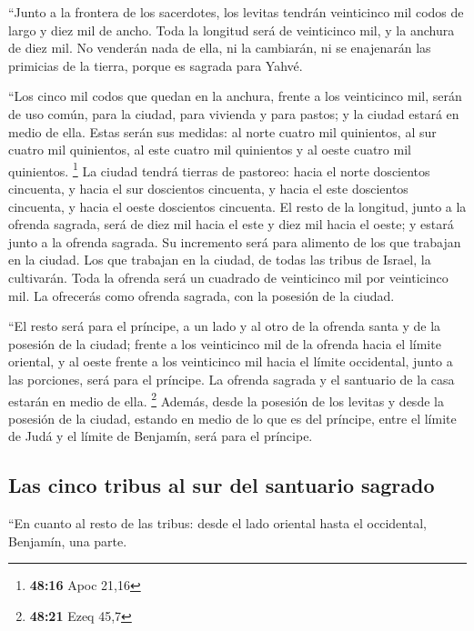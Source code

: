 ``Junto a la frontera de los sacerdotes, los levitas
tendrán veinticinco mil codos de largo y diez mil de ancho. Toda la
longitud será de veinticinco mil, y la anchura de diez mil.
 No venderán nada de ella, ni la cambiarán, ni se
enajenarán las primicias de la tierra, porque es sagrada para Yahvé.

 ``Los cinco mil codos que quedan en la anchura, frente a
los veinticinco mil, serán de uso común, para la ciudad, para vivienda y
para pastos; y la ciudad estará en medio de ella.  Estas
serán sus medidas: al norte cuatro mil quinientos, al sur cuatro mil
quinientos, al este cuatro mil quinientos y al oeste cuatro mil
quinientos. \footnote{\textbf{48:16} Apoc 21,16}  La
ciudad tendrá tierras de pastoreo: hacia el norte doscientos cincuenta,
y hacia el sur doscientos cincuenta, y hacia el este doscientos
cincuenta, y hacia el oeste doscientos cincuenta.  El
resto de la longitud, junto a la ofrenda sagrada, será de diez mil hacia
el este y diez mil hacia el oeste; y estará junto a la ofrenda sagrada.
Su incremento será para alimento de los que trabajan en la ciudad.
 Los que trabajan en la ciudad, de todas las tribus de
Israel, la cultivarán.  Toda la ofrenda será un cuadrado
de veinticinco mil por veinticinco mil. La ofrecerás como ofrenda
sagrada, con la posesión de la ciudad.

 ``El resto será para el príncipe, a un lado y al otro de
la ofrenda santa y de la posesión de la ciudad; frente a los veinticinco
mil de la ofrenda hacia el límite oriental, y al oeste frente a los
veinticinco mil hacia el límite occidental, junto a las porciones, será
para el príncipe. La ofrenda sagrada y el santuario de la casa estarán
en medio de ella. \footnote{\textbf{48:21} Ezeq 45,7} 
Además, desde la posesión de los levitas y desde la posesión de la
ciudad, estando en medio de lo que es del príncipe, entre el límite de
Judá y el límite de Benjamín, será para el príncipe.

\hypertarget{las-cinco-tribus-al-sur-del-santuario-sagrado}{%
\subsection{Las cinco tribus al sur del santuario
sagrado}\label{las-cinco-tribus-al-sur-del-santuario-sagrado}}

 ``En cuanto al resto de las tribus: desde el lado
oriental hasta el occidental, Benjamín, una parte.

